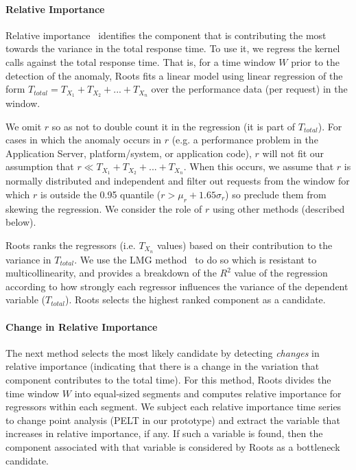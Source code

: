 \paragraph*{Relative Importance}
Relative importance~\cite{JSSv017i01} identifies the component that is contributing 
the most towards the variance in the total response time. 
To use it, we regress the kernel calls against the total response time.
That is, for a time window $W$ prior to the detection of the anomaly, Roots
fits a linear model using linear regression of the form
$T_{total} = T_{X_1} + T_{X_2} + ... + T_{X_n}$
over the performance data (per request) in the window.

We omit $r$ so as not to double count it in the regression
(it is part of $T_{total}$).
For cases in which the anomaly occurs in $r$ (e.g. a performance problem in the 
Application Server, platform/system, or application code), $r$ will 
not fit our assumption that $r \ll T_{X_1} + T_{X_2} + ... + T_{X_n}$.  When this
occurs, we assume that $r$ is normally distributed and independent and filter out
requests from the window for which $r$ is outside the 0.95 quantile ($r > \mu_r + 1.65\sigma_r$)
so preclude them from skewing the regression. 
We consider the role of $r$ 
using other methods (described below).

Roots ranks the regressors (i.e. $T_{X_n}$ values) based on their contribution to the variance 
in $T_{total}$.  We use the LMG method~\cite{lmg80} to do so which is resistant to multicollinearity, 
and provides a breakdown of the $R^2$ value of
the regression according to how strongly each regressor influences
the variance of the dependent variable ($T_{total}$).
Roots selects the highest ranked component as a candidate.

\paragraph*{Change in Relative Importance}
The next method selects the most likely candidate by detecting \textit{changes} in relative importance
(indicating that there is a change in the variation that component contributes to the total time).
For this method, Roots divides the time window $W$ into equal-sized segments
and computes relative importance for regressors within each segment. 
We subject each relative importance time series to change point analysis (PELT in our prototype) 
and extract the variable that increases in relative importance, if any.
If such a variable is found, then the component
associated with that variable is considered by Roots as a bottleneck candidate.

